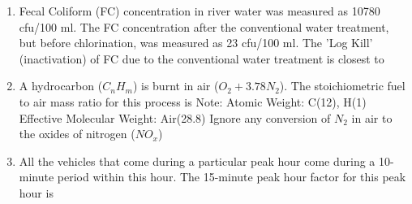 \documentclass[journal,12pt,onecolumn]{article}
\theoremstyle{remark}
\begin{document}
\begin{enumerate}
\item Fecal Coliform (FC) concentration in river water was measured as 10780 cfu/100 ml. The FC concentration after the conventional water treatment, but before chlorination, was measured as 23 cfu/100 ml. The 'Log Kill' (inactivation) of FC due to the conventional water treatment is closest to

\hfill{}
\begin{enumerate}
\end{enumerate}

\item A hydrocarbon ($C_n H_m$) is burnt in air ($O_2 + 3.78 N_2$). The stoichiometric fuel to air mass ratio for this process is
Note: Atomic Weight: C(12), H(1)
Effective Molecular Weight: Air(28.8)
Ignore any conversion of $N_2$ in air to the oxides of nitrogen ($NO_x$)

\hfill{}
\begin{enumerate}
\end{enumerate}

\item All the vehicles that come during a particular peak hour come during a 10-minute period within this hour. The 15-minute peak hour factor for this peak hour is

\hfill{}
\begin{enumerate}
\end{enumerate}


\end{enumerate}
\end{document}

